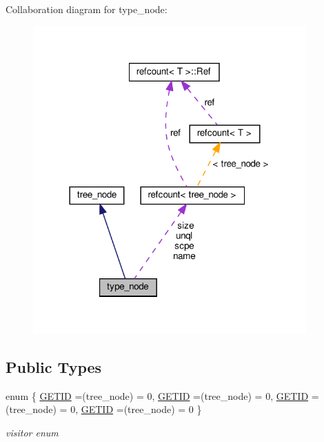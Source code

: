 Collaboration diagram for type\+\_\+node\+:
\nopagebreak
\begin{figure}[H]
\begin{center}
\leavevmode
\includegraphics[width=297pt]{dc/d75/structtype__node__coll__graph}
\end{center}
\end{figure}
\subsection*{Public Types}
\begin{DoxyCompactItemize}
\item 
enum \{ \hyperlink{structtype__node_a19bb5bee3a0fa16d1401977070f0995fa21beb3613899b2e4fb5ab4661e6743da}{G\+E\+T\+ID} =(tree\+\_\+node) = 0, 
\hyperlink{structtype__node_a19bb5bee3a0fa16d1401977070f0995fa21beb3613899b2e4fb5ab4661e6743da}{G\+E\+T\+ID} =(tree\+\_\+node) = 0, 
\hyperlink{structtype__node_a19bb5bee3a0fa16d1401977070f0995fa21beb3613899b2e4fb5ab4661e6743da}{G\+E\+T\+ID} =(tree\+\_\+node) = 0, 
\hyperlink{structtype__node_a19bb5bee3a0fa16d1401977070f0995fa21beb3613899b2e4fb5ab4661e6743da}{G\+E\+T\+ID} =(tree\+\_\+node) = 0
 \}\begin{DoxyCompactList}\small\item\em visitor enum \end{DoxyCompactList}
\end{DoxyCompactItemize}

